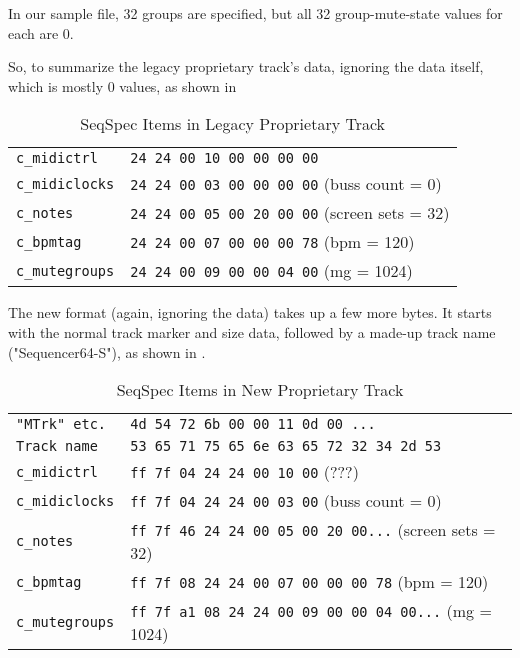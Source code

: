    In our sample file, 32 groups are specified, but all 32 group-mute-state
   values for each are 0.

   So, to summarize the legacy proprietary track's data, ignoring the data
   itself, which is mostly 0 values, as shown in

   \begin{table}[htb]
      \centering
      \caption{SeqSpec Items in Legacy Proprietary Track}
      \label{table:seqspec_items_legacy_track}
      \begin{tabular}{l l}
\texttt{c\_midictrl}    & \texttt{24 24 00 10 00 00 00 00} \\
\texttt{c\_midiclocks}  & \texttt{24 24 00 03 00 00 00 00} (buss count = 0) \\
\texttt{c\_notes}       & \texttt{24 24 00 05 00 20 00 00} (screen sets = 32) \\
\texttt{c\_bpmtag}      & \texttt{24 24 00 07 00 00 00 78} (bpm = 120) \\
\texttt{c\_mutegroups}  & \texttt{24 24 00 09 00 00 04 00} (mg = 1024) \\
      \end{tabular}
   \end{table}

   The new format (again, ignoring the data) takes up a few more bytes.
   It starts with the normal track marker and size data, followed by a
   made-up track name ("Sequencer64-S"),
   as shown in .

   \begin{table}[htb]
      \centering
      \caption{SeqSpec Items in New Proprietary Track}
      \label{table:seqspec_items_new_track}
      \begin{tabular}{l l}
\texttt{"MTrk" etc.}   & \texttt{4d 54 72 6b 00 00 11 0d 00 ...} \\
\texttt{Track name}    & \texttt{53 65 71 75 65 6e 63 65 72 32 34 2d 53} \\
\texttt{c\_midictrl}   & \texttt{ff 7f 04 24 24 00 10 00} (???) \\
\texttt{c\_midiclocks} & \texttt{ff 7f 04 24 24 00 03 00} (buss count = 0) \\
\texttt{c\_notes}      & \texttt{ff 7f 46 24 24 00 05 00 20 00...} (screen sets = 32) \\
\texttt{c\_bpmtag}     & \texttt{ff 7f 08 24 24 00 07 00 00 00 78} (bpm = 120) \\
\texttt{c\_mutegroups} & \texttt{ff 7f a1 08 24 24 00 09 00 00 04 00...} (mg = 1024) \\
      \end{tabular}
   \end{table}

